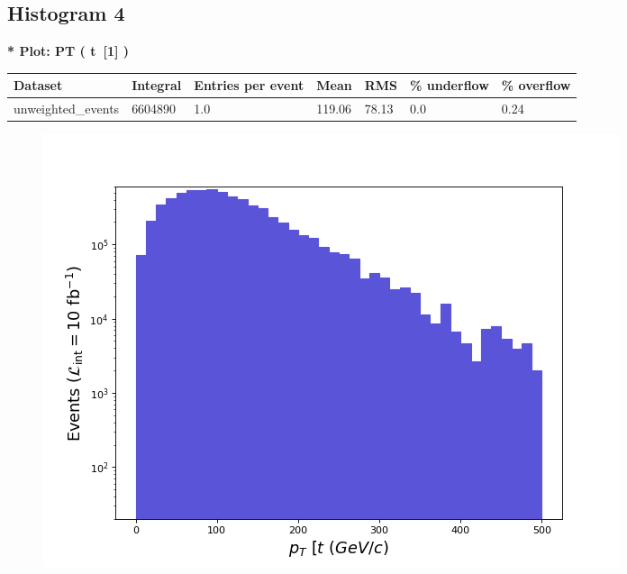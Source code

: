 \documentclass[a4paper, 10pt]{article}
\begin{document}
\subsection{ Histogram 4}

\textbf{* Plot: PT ( t~[1] ) }\\
   \begin{table}[H]
  \begin{center}
    \begin{tabular}{|m{23.0mm}|m{23.0mm}|m{18.0mm}|m{19.0mm}|m{19.0mm}|m{19.0mm}|m{19.0mm}|}
      \hline
      {\cellcolor{yellow}         Dataset}& {\cellcolor{yellow}         Integral}& {\cellcolor{yellow}         Entries per event}& {\cellcolor{yellow}         Mean}& {\cellcolor{yellow}         RMS}& {\cellcolor{yellow}         \% underflow}& {\cellcolor{yellow}         \% overflow}\\
      \hline
      {\cellcolor{white}         unweighted\_events}& {\cellcolor{white}         6604890}& {\cellcolor{white}         1.0}& {\cellcolor{white}         119.06}& {\cellcolor{white}         78.13}& {\cellcolor{green}         0.0}& {\cellcolor{green}         0.24}\\
\hline
    \end{tabular}
  \end{center}
\end{table}

\begin{figure}[H]
  \begin{center}
    \includegraphics[scale=0.45]{selection_3.png}\\
\caption{   }
  \end{center}
\end{figure}
      \newpage
\end{document}

